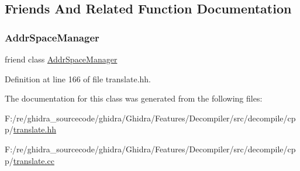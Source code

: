 \subsection{Friends And Related Function Documentation}
\mbox{\label{class_spacebase_space_a0e578f3e90e10ec045899c0e9cb65d46}} 
\subsubsection{\texorpdfstring{AddrSpaceManager}{AddrSpaceManager}}
{\footnotesize\ttfamily friend class \mbox{\hyperlink{class_addr_space_manager}{Addr\+Space\+Manager}}\hspace{0.3cm}{\ttfamily [friend]}}



Definition at line 166 of file translate.\+hh.



The documentation for this class was generated from the following files\+:\begin{DoxyCompactItemize}
\item 
F\+:/re/ghidra\+\_\+sourcecode/ghidra/\+Ghidra/\+Features/\+Decompiler/src/decompile/cpp/\mbox{\hyperlink{translate_8hh}{translate.\+hh}}\item 
F\+:/re/ghidra\+\_\+sourcecode/ghidra/\+Ghidra/\+Features/\+Decompiler/src/decompile/cpp/\mbox{\hyperlink{translate_8cc}{translate.\+cc}}\end{DoxyCompactItemize}
